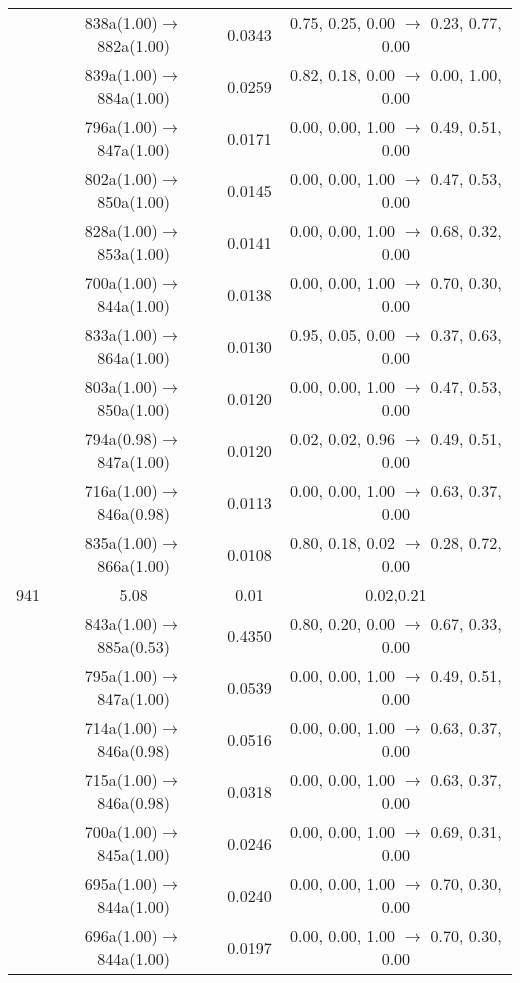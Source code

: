 \documentclass[10pt,a4paper]{article}
\begin{document}
\begin{longtable}{c|c|c|c}
 	& 838a(1.00)$\rightarrow$882a(1.00) &	 0.0343 &	 0.75, 0.25, 0.00 $\rightarrow$ 0.23, 0.77, 0.00 \\ 
 	& 839a(1.00)$\rightarrow$884a(1.00) &	 0.0259 &	 0.82, 0.18, 0.00 $\rightarrow$ 0.00, 1.00, 0.00 \\ 
 	& 796a(1.00)$\rightarrow$847a(1.00) &	 0.0171 &	 0.00, 0.00, 1.00 $\rightarrow$ 0.49, 0.51, 0.00 \\ 
 	& 802a(1.00)$\rightarrow$850a(1.00) &	 0.0145 &	 0.00, 0.00, 1.00 $\rightarrow$ 0.47, 0.53, 0.00 \\ 
 	& 828a(1.00)$\rightarrow$853a(1.00) &	 0.0141 &	 0.00, 0.00, 1.00 $\rightarrow$ 0.68, 0.32, 0.00 \\ 
 	& 700a(1.00)$\rightarrow$844a(1.00) &	 0.0138 &	 0.00, 0.00, 1.00 $\rightarrow$ 0.70, 0.30, 0.00 \\ 
 	& 833a(1.00)$\rightarrow$864a(1.00) &	 0.0130 &	 0.95, 0.05, 0.00 $\rightarrow$ 0.37, 0.63, 0.00 \\ 
 	& 803a(1.00)$\rightarrow$850a(1.00) &	 0.0120 &	 0.00, 0.00, 1.00 $\rightarrow$ 0.47, 0.53, 0.00 \\ 
 	& 794a(0.98)$\rightarrow$847a(1.00) &	 0.0120 &	 0.02, 0.02, 0.96 $\rightarrow$ 0.49, 0.51, 0.00 \\ 
 	& 716a(1.00)$\rightarrow$846a(0.98) &	 0.0113 &	 0.00, 0.00, 1.00 $\rightarrow$ 0.63, 0.37, 0.00 \\ 
 	& 835a(1.00)$\rightarrow$866a(1.00) &	 0.0108 &	 0.80, 0.18, 0.02 $\rightarrow$ 0.28, 0.72, 0.00 \\ 
 \hline941 &	 5.08 &	 0.01 &	 0.02,0.21 \\ 
  	& 843a(1.00)$\rightarrow$885a(0.53) &	 0.4350 &	 0.80, 0.20, 0.00 $\rightarrow$ 0.67, 0.33, 0.00 \\ 
 	& 795a(1.00)$\rightarrow$847a(1.00) &	 0.0539 &	 0.00, 0.00, 1.00 $\rightarrow$ 0.49, 0.51, 0.00 \\ 
 	& 714a(1.00)$\rightarrow$846a(0.98) &	 0.0516 &	 0.00, 0.00, 1.00 $\rightarrow$ 0.63, 0.37, 0.00 \\ 
 	& 715a(1.00)$\rightarrow$846a(0.98) &	 0.0318 &	 0.00, 0.00, 1.00 $\rightarrow$ 0.63, 0.37, 0.00 \\ 
 	& 700a(1.00)$\rightarrow$845a(1.00) &	 0.0246 &	 0.00, 0.00, 1.00 $\rightarrow$ 0.69, 0.31, 0.00 \\ 
 	& 695a(1.00)$\rightarrow$844a(1.00) &	 0.0240 &	 0.00, 0.00, 1.00 $\rightarrow$ 0.70, 0.30, 0.00 \\ 
 	& 696a(1.00)$\rightarrow$844a(1.00) &	 0.0197 &	 0.00, 0.00, 1.00 $\rightarrow$ 0.70, 0.30, 0.00 \\ 

\end{longtable}
\end{document}
